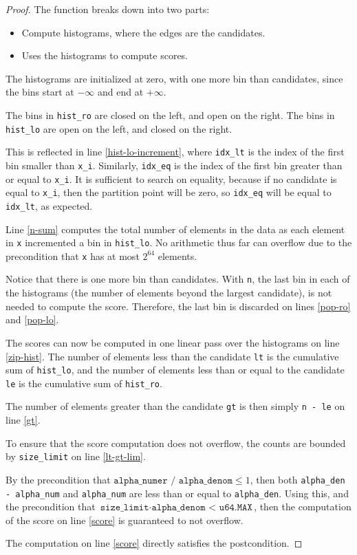\documentclass{article}
\begin{document}
\begin{proof}
    The function breaks down into two parts:
    \begin{itemize}
        \item Compute histograms, where the edges are the candidates.
        \item Uses the histograms to compute scores.
    \end{itemize}

    The histograms are initialized at zero, with one more bin than candidates,
    since the bins start at $-\infty$ and end at $+\infty$.

    The bins in \texttt{hist\_ro} are closed on the left, and open on the right.
    The bins in \texttt{hist\_lo} are open on the left, and closed on the right.

    This is reflected in line \ref{hist-lo-increment}, where \texttt{idx\_lt} is the index of the first bin smaller than \texttt{x\_i}.
    Similarly, \texttt{idx\_eq} is the index of the first bin greater than or equal to \texttt{x\_i}.
    It is sufficient to search on equality, because if no candidate is equal to \texttt{x\_i},
    then the partition point will be zero, so \texttt{idx\_eq} will be equal to \texttt{idx\_lt}, as expected.

    Line \ref{n-sum} computes the total number of elements in the data as each element in \texttt{x} incremented a bin in \texttt{hist\_lo}.
    No arithmetic thus far can overflow due to the precondition that \texttt{x} has at most $2^64$ elements.

    Notice that there is one more bin than candidates.
    With \texttt{n}, the last bin in each of the histograms (the number of elements beyond the largest candidate),
    is not needed to compute the score.
    Therefore, the last bin is discarded on lines \ref{pop-ro} and \ref{pop-lo}.

    The scores can now be computed in one linear pass over the histograms on line \ref{zip-hist}.
    The number of elements less than the candidate \texttt{lt} is the cumulative sum of \texttt{hist\_lo},
    and the number of elements less than or equal to the candidate \texttt{le} is the cumulative sum of \texttt{hist\_ro}.
    
    The number of elements greater than the candidate \texttt{gt} is then simply \texttt{n - le} on line \ref{gt}.

    To ensure that the score computation does not overflow, the counts are bounded by \texttt{size\_limit} on line \ref{lt-gt-lim}.

    By the precondition that $\texttt{alpha\_numer / alpha\_denom} \le 1$,
    then both \texttt{alpha\_den - alpha\_num} and \texttt{alpha\_num} are less than or equal to \texttt{alpha\_den}.
    Using this, and the precondition that $\texttt{size\_limit} \cdot \texttt{alpha\_denom < u64.MAX}$,
    then the computation of the score on line \ref{score} is guaranteed to not overflow.

    The computation on line \ref{score} directly satisfies the postcondition.
\end{proof}
\end{document}
